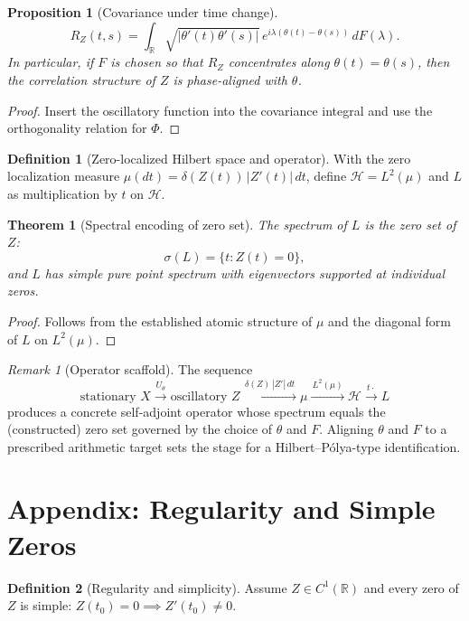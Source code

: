 \documentclass[12pt]{article}
\newtheorem{theorem}{Theorem}
\newtheorem{proposition}{Proposition}
\theoremstyle{definition}
\newtheorem{definition}{Definition}
\theoremstyle{remark}
\newtheorem{remark}{Remark}
\begin{document}
\begin{proposition}[Covariance under time change]
\[
R_Z(t,s)=\int_{\mathbb{R}} \sqrt{|\theta'(t)\theta'(s)|}\,e^{i\lambda(\theta(t)-\theta(s))}\,dF(\lambda).
\]
In particular, if $F$ is chosen so that $R_Z$ concentrates along $\theta(t)=\theta(s)$, then the correlation structure of $Z$ is phase-aligned with $\theta$.
\end{proposition}

\begin{proof}
Insert the oscillatory function into the covariance integral and use the orthogonality relation for $\Phi$.
\end{proof}

\begin{definition}[Zero-localized Hilbert space and operator]
With the zero localization measure $\mu(dt)=\delta(Z(t))\,|Z'(t)|\,dt$, define $\mathcal{H}=L^2(\mu)$ and $L$ as multiplication by $t$ on $\mathcal{H}$.
\end{definition}

\begin{theorem}[Spectral encoding of zero set]
The spectrum of $L$ is the zero set of $Z$:
\[
\sigma(L)=\{t: Z(t)=0\},
\]
and $L$ has simple pure point spectrum with eigenvectors supported at individual zeros.
\end{theorem}

\begin{proof}
Follows from the established atomic structure of $\mu$ and the diagonal form of $L$ on $L^2(\mu)$.
\end{proof}

\begin{remark}[Operator scaffold]
The sequence
\[
\text{stationary }X \xrightarrow{\,U_\theta\,} \text{oscillatory }Z \xrightarrow{\,\delta(Z)\,|Z'|\,dt\,} \mu \xrightarrow{\,L^2(\mu)\,} \mathcal{H} \xrightarrow{\,t\cdot\,} L
\]
produces a concrete self-adjoint operator whose spectrum equals the (constructed) zero set governed by the choice of $\theta$ and $F$. Aligning $\theta$ and $F$ to a prescribed arithmetic target sets the stage for a Hilbert--P\'olya-type identification.
\end{remark}

\section{Appendix: Regularity and Simple Zeros}

\begin{definition}[Regularity and simplicity]
Assume $Z\in C^1(\mathbb{R})$ and every zero of $Z$ is simple: $Z(t_0)=0\implies Z'(t_0)\neq 0$.
\end{definition}
\end{document}
